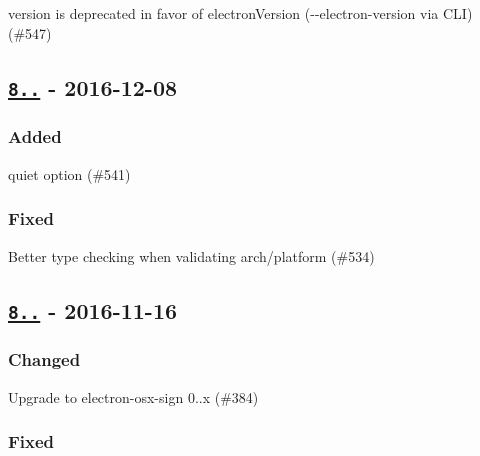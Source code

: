 \begin{DoxyItemize}
\item {\ttfamily version} is deprecated in favor of {\ttfamily electron\+Version} ({\ttfamily -\/-\/electron-\/version} via C\+LI) (\#547)
\end{DoxyItemize}

\subsection*{\href{https://github.com/electron-userland/electron-packager/compare/v8.3.0...v8.4.0}{\tt 8..} -\/ 2016-\/12-\/08}

\subsubsection*{Added}


\begin{DoxyItemize}
\item {\ttfamily quiet} option (\#541)
\end{DoxyItemize}

\subsubsection*{Fixed}


\begin{DoxyItemize}
\item Better type checking when validating arch/platform (\#534)
\end{DoxyItemize}

\subsection*{\href{https://github.com/electron-userland/electron-packager/compare/v8.2.0...v8.3.0}{\tt 8..} -\/ 2016-\/11-\/16}

\subsubsection*{Changed}


\begin{DoxyItemize}
\item Upgrade to electron-\/osx-\/sign 0..\+x (\#384)
\end{DoxyItemize}

\subsubsection*{Fixed}


